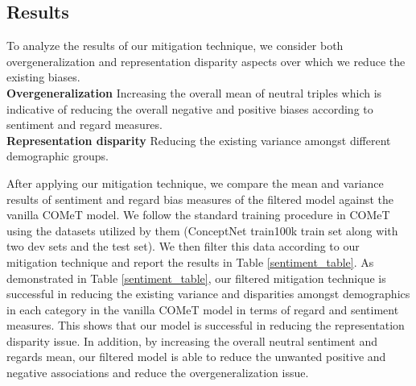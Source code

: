 \subsection{Results}
To analyze the results of our mitigation technique, we consider both overgeneralization and representation disparity aspects over which we reduce the existing biases. \\
\textbf{Overgeneralization} Increasing the overall mean of neutral triples which is indicative of reducing the overall negative and positive biases according to sentiment and regard measures. \\
\textbf{Representation disparity} Reducing the existing variance amongst different demographic groups. 


After applying our mitigation technique, we compare the mean and variance results of sentiment and regard bias measures of the filtered model against the vanilla COMeT model. We follow the standard training procedure in COMeT using the datasets utilized by them (ConceptNet train100k train set along with two dev sets and the test set). We then filter this data according to our mitigation technique and report the results in Table \ref{sentiment_table}. As demonstrated in Table \ref{sentiment_table}, our filtered mitigation technique is successful in reducing the existing variance and disparities amongst demographics in each category in the vanilla COMeT model in terms of regard and sentiment measures. This shows that our model is successful in reducing the representation disparity issue. In addition, by increasing the overall neutral sentiment and regards mean, our filtered model is able to reduce the unwanted positive and negative associations and reduce the overgeneralization issue.

